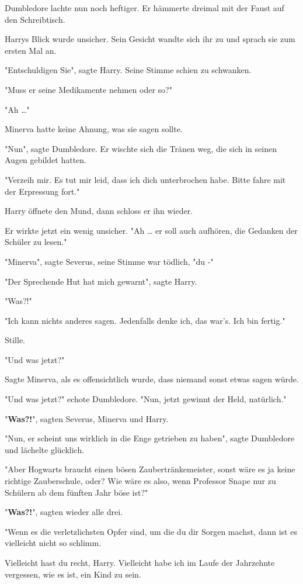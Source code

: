 {Dumbledore lachte nun noch heftiger. Er hämmerte dreimal mit der Faust auf den Schreibtisch.

Harrys Blick wurde unsicher. Sein Gesicht wandte sich ihr zu und sprach sie zum ersten Mal an.

"Entschuldigen Sie", sagte Harry. Seine Stimme schien zu schwanken.

"Muss er seine Medikamente nehmen oder so?"

"Ah …"

Minerva hatte keine Ahnung, was sie sagen sollte.

"Nun", sagte Dumbledore. Er wischte sich die Tränen weg, die sich in seinen Augen gebildet hatten.

"Verzeih mir. Es tut mir leid, dass ich dich unterbrochen habe. Bitte fahre mit der Erpressung fort."

Harry öffnete den Mund, dann schloss er ihn wieder.

Er wirkte jetzt ein wenig unsicher. "Ah … er soll auch aufhören, die Gedanken der Schüler zu lesen."

"Minerva", sagte Severus, seine Stimme war tödlich, "du -"

"Der Sprechende Hut hat mich gewarnt", sagte Harry.

"Was?!"

"Ich kann nichts anderes sagen. Jedenfalls denke ich, das war's. Ich bin fertig."

Stille.

"Und was jetzt?"

Sagte Minerva, als es offensichtlich wurde, dass niemand sonst etwas sagen würde.

"Und was jetzt?" echote Dumbledore. "Nun, jetzt gewinnt der Held, natürlich."

"\textbf{Was?!}", sagten Severus, Minerva und Harry.

"Nun, er scheint uns wirklich in die Enge getrieben zu haben", sagte Dumbledore und lächelte glücklich.

"Aber Hogwarts braucht einen bösen Zaubertränkemeister, sonst wäre es ja keine richtige Zauberschule, oder? Wie wäre es also, wenn Professor Snape nur zu Schülern ab dem fünften Jahr böse ist?"

"\textbf{Was?!}", sagten wieder alle drei.

"Wenn es die verletzlichsten Opfer sind, um die du dir Sorgen machst, dann ist es vielleicht nicht so schlimm.

Vielleicht hast du recht, Harry. Vielleicht habe ich im Laufe der Jahrzehnte vergessen, wie es ist, ein Kind zu sein.

}

